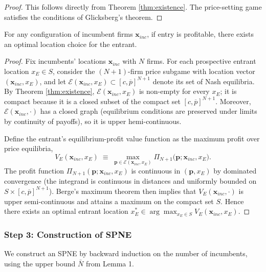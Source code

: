\documentclass{article}
\begin{document}
\begin{proof}
  This follows directly from Theorem \ref{thm:existence}. The price-setting game satisfies the conditions of Glicksberg's theorem.
\end{proof}

\begin{lemma}
  For any configuration of incumbent firms $\mathbf{x}_{inc}$, if entry is profitable, there exists an optimal location choice for the entrant.
\end{lemma}

\begin{proof}
  Fix incumbents' locations $\mathbf{x}_{inc}$ with $N$ firms. For each prospective entrant location $x_E\in S$, consider the $(N+1)$-firm price subgame with location vector $(\mathbf{x}_{inc},x_E)$, and let $\mathcal{E}(\mathbf{x}_{inc},x_E)\subset[c,\overline{p}]^{N+1}$ denote its set of Nash equilibria.
  By Theorem \ref{thm:existence}, $\mathcal{E}(\mathbf{x}_{inc},x_E)$ is non-empty for every $x_E$; it is compact because it is a closed subset of the compact set $[c,\overline{p}]^{N+1}$.
  Moreover, $\mathcal{E}(\mathbf{x}_{inc},\cdot)$ has a closed graph (equilibrium conditions are preserved under limits by continuity of payoffs), so it is upper hemi-continuous.

  Define the entrant's equilibrium-profit value function as the maximum profit over price equilibria,
  \[
    V_E(\mathbf{x}_{inc},x_E)
    \;\equiv\;
    \max_{\mathbf{p}\in\mathcal{E}(\mathbf{x}_{inc},x_E)}
    \Pi_{N+1}\bigl(\mathbf{p};\mathbf{x}_{inc},x_E\bigr).
  \]
  The profit function $\Pi_{N+1}(\mathbf{p};\mathbf{x}_{inc},x_E)$ is continuous in $(\mathbf{p},x_E)$ by dominated convergence (the integrand is continuous in distances and uniformly bounded on $S\times[c,\overline{p}]^{N+1}$).
  Berge's maximum theorem then implies that $V_E(\mathbf{x}_{inc},\cdot)$ is upper semi-continuous and attains a maximum on the compact set $S$.
  Hence there exists an optimal entrant location $x_E^*\in\arg\max_{x_E\in S} V_E(\mathbf{x}_{inc},x_E)$.
\end{proof}

\subsubsection*{Step 3: Construction of SPNE}

We construct an SPNE by backward induction on the number of incumbents, using the upper bound $\bar{N}$ from Lemma 1.
\end{document}
